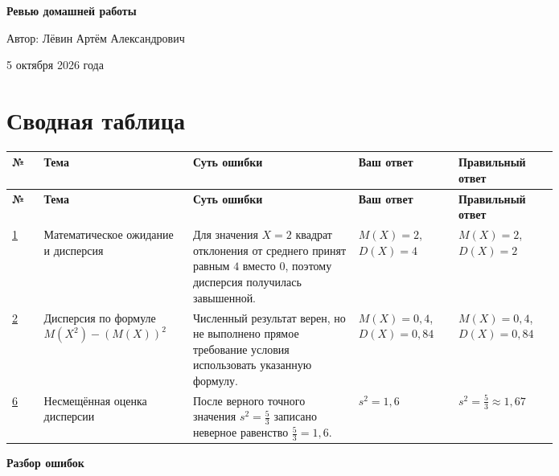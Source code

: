 \documentclass[12pt,a4paper]{article}
\begin{document}
\begin{titlepage}
\thispagestyle{empty}
\begin{center}
\vspace*{0.27\textheight}
{\LARGE\bfseries Ревью домашней работы\par}
\vspace{1.5cm}
{\large Автор: Лёвин Артём Александрович\par}
\vspace{0.5cm}
{\large 5 октября 2026 года\par}
\vfill
{}
\end{center}
\end{titlepage}

\newpage
\section*{Сводная таблица}
\small
\begin{longtable}{p{0.055\linewidth}p{0.17\linewidth}p{0.265\linewidth}p{0.15\linewidth}p{0.15\linewidth}}
\toprule
\textbf{№} & \textbf{Тема} & \textbf{Суть ошибки} & \textbf{Ваш ответ} & \textbf{Правильный ответ}\\
\midrule
\endfirsthead
\toprule
\textbf{№} & \textbf{Тема} & \textbf{Суть ошибки} & \textbf{Ваш ответ} & \textbf{Правильный ответ}\\
\midrule
\endhead
\hyperref[task:1]{1} & Математическое ожидание и дисперсия & Для значения $X=2$ квадрат отклонения от среднего принят равным $4$ вместо $0$, поэтому дисперсия получилась завышенной. & $M(X)=2$, $D(X)=4$ & $M(X)=2$, $D(X)=2$\\
\midrule
\hyperref[task:2]{2} & Дисперсия по формуле $M(X^2)-(M(X))^2$ & Численный результат верен, но не выполнено прямое требование условия использовать указанную формулу. & $M(X)=0{,}4$, $D(X)=0{,}84$ & $M(X)=0{,}4$, $D(X)=0{,}84$\\
\midrule
\hyperref[task:6]{6} & Несмещённая оценка дисперсии & После верного точного значения $s^2=\frac53$ записано неверное равенство $\frac53=1{,}6$. & $s^2=1{,}6$ & $s^2=\frac53\approx1{,}67$\\
\bottomrule
\end{longtable}
\normalsize

\newpage
\thispagestyle{empty}
\vspace*{\fill}
\begin{center}
{\LARGE\bfseries Разбор ошибок}
\end{center}
\vspace*{\fill}
\end{document}
